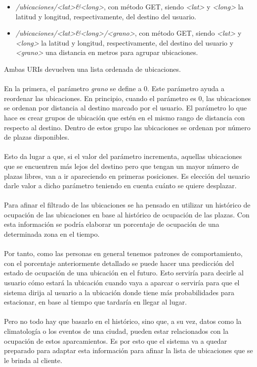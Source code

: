 \begin{itemize}
	\item \textit{/ubicaciones/<lat>\&<long>}, con método GET, siendo \textit{<lat>} y \textit{<long>} la latitud y longitud, respectivamente, del destino del usuario.
	\item \textit{/ubicaciones/<lat>\&<long>/<grano>}, con método GET, siendo \textit{<lat>} y \textit{<long>} la latitud y longitud, respectivamente, del destino del usuario y \textit{<grano>} una distancia en metros para agrupar ubicaciones.
\end{itemize}
Ambas URIs devuelven una lista ordenada de ubicaciones.
\\\\
En la primera, el parámetro \textit{grano} se define a 0. Este parámetro ayuda a reordenar las ubicaciones. En principio, cuando el parámetro es 0, las ubicaciones se ordenan por distancia al destino marcado por el usuario. El parámetro lo que hace es crear grupos de ubicación que estén en el mismo rango de distancia con respecto al destino. Dentro de estos grupo las ubicaciones se ordenan por número de plazas disponibles. 
\\\\
Esto da lugar a que, si el valor del parámetro incrementa, aquellas ubicaciones que se encuentren más lejos del destino pero que tengan un mayor número de plazas libres, van a ir apareciendo en primeras posiciones. Es elección del usuario darle valor a dicho parámetro teniendo en cuenta cuánto se quiere desplazar.
\\\\
Para afinar el filtrado de las ubicaciones se ha pensado en utilizar un histórico de ocupación de las ubicaciones en base al histórico de ocupación de las plazas. Con esta información se podría elaborar un porcentaje de ocupación de una determinada zona en el tiempo.
\\\\
Por tanto, como las personas en general tenemos patrones de comportamiento, con el porcentaje anteriormente detallado se puede hacer una predicción del estado de ocupación de una ubicación en el futuro. Esto serviría para decirle al usuario cómo estará la ubicación cuando vaya a aparcar o serviría para que el sistema dirija al usuario a la ubicación donde tiene más probabilidades para estacionar, en base al tiempo que tardaría en llegar al lugar.
\\\\
Pero no todo hay que basarlo en el histórico, sino que, a su vez, datos como la climatología o los eventos de una ciudad, pueden estar relacionados con la ocupación de estos aparcamientos. Es por esto que el sistema va a quedar preparado para adaptar esta información para afinar la lista de ubicaciones que se le brinda al cliente.
